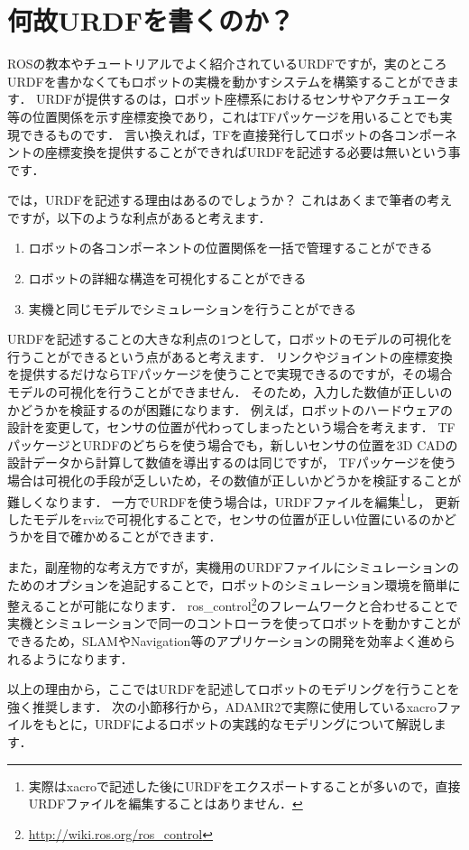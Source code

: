 \documentclass[{../../master}]{subfiles}
\begin{document}
\section{何故URDFを書くのか？}

ROSの教本やチュートリアルでよく紹介されているURDFですが，実のところURDFを書かなくてもロボットの実機を動かすシステムを構築することができます．
URDFが提供するのは，ロボット座標系におけるセンサやアクチュエータ等の位置関係を示す座標変換であり，これはTFパッケージを用いることでも実現できるものです．
言い換えれば，TFを直接発行してロボットの各コンポーネントの座標変換を提供することができればURDFを記述する必要は無いという事です．

では，URDFを記述する理由はあるのでしょうか？
これはあくまで筆者の考えですが，以下のような利点があると考えます．

\begin{enumerate}
  \item ロボットの各コンポーネントの位置関係を一括で管理することができる
  \item ロボットの詳細な構造を可視化することができる
  \item 実機と同じモデルでシミュレーションを行うことができる
\end{enumerate}

URDFを記述することの大きな利点の1つとして，ロボットのモデルの可視化を行うことができるという点があると考えます．
リンクやジョイントの座標変換を提供するだけならTFパッケージを使うことで実現できるのですが，その場合モデルの可視化を行うことができません．
そのため，入力した数値が正しいのかどうかを検証するのが困難になります．
例えば，ロボットのハードウェアの設計を変更して，センサの位置が代わってしまったという場合を考えます．
TFパッケージとURDFのどちらを使う場合でも，新しいセンサの位置を3D CADの設計データから計算して数値を導出するのは同じですが，
TFパッケージを使う場合は可視化の手段が乏しいため，その数値が正しいかどうかを検証することが難しくなります．
一方でURDFを使う場合は，URDFファイルを編集\footnote{実際は\textsf{xacro}で記述した後にURDFをエクスポートすることが多いので，直接URDFファイルを編集することはありません．}し，
更新したモデルを\textsf{rviz}で可視化することで，センサの位置が正しい位置にいるのかどうかを目で確かめることができます．

また，副産物的な考え方ですが，実機用のURDFファイルにシミュレーションのためのオプションを追記することで，ロボットのシミュレーション環境を簡単に整えることが可能になります．
\textsf{ros\_control}\footnote{\url{http://wiki.ros.org/ros_control}}のフレームワークと合わせることで実機とシミュレーションで同一のコントローラを使ってロボットを動かすことができるため，SLAMやNavigation等のアプリケーションの開発を効率よく進められるようになります．

以上の理由から，ここではURDFを記述してロボットのモデリングを行うことを強く推奨します．
次の小節移行から，ADAMR2で実際に使用している\textsf{xacro}ファイルをもとに，URDFによるロボットの実践的なモデリングについて解説します．
\end{document}
